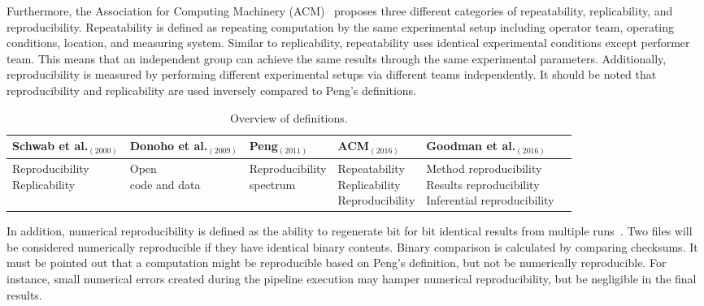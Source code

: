 Furthermore, the Association for Computing Machinery 
(ACM)~\cite{acm2016terminology} proposes three different categories of 
repeatability, replicability, and reproducibility. Repeatability is 
defined as repeating computation by the same experimental setup 
including operator team, operating conditions, location, and measuring 
system. 
Similar to replicability, repeatability uses identical experimental 
conditions except performer team.
This means that an independent group can achieve the 
same results through the same experimental parameters. 
Additionally, reproducibility is measured by performing 
different experimental setups via different teams 
independently. It should be noted that reproducibility and 
replicability are used inversely compared to Peng's definitions. 

\setlength{\tabcolsep}{1pt}
\begin{table}[H]
\hspace*{-1cm}
\caption{Overview of definitions.}
\label{table:definitions}
\centering
\begin{threeparttable}
\begin{tabular}{@{}llllll@{}}
\toprule
Schwab et al.$_{(2000)}$ & Donoho et al.$_{(2009)}$ & Peng$_{(2011)}$ & 
ACM$_{(2016)}$ & Goodman et al.$_{(2016)}$ \\ \midrule
\makecell{Reproducibility \\ Replicability} &   \makecell{Open \\ code 
and data} &   \makecell{Reproducibility \\ spectrum}  &   
\makecell{Repeatability \\ Replicability \\ Reproducibility} & 
\makecell{Method reproducibility \\ Results reproducibility \\ Inferential reproducibility}    \\ \bottomrule
\end{tabular}
\end{threeparttable}
\end{table}

In addition, numerical reproducibility is defined as the ability to 
regenerate bit for bit identical results from multiple 
runs~\cite{hill2017numerical}. Two files will be considered numerically 
reproducible if they have identical binary contents. Binary 
comparison is calculated by comparing checksums. It must be pointed out 
that a computation might be reproducible based on Peng's definition, 
but not be numerically reproducible. For instance, small numerical 
errors created during the pipeline execution may hamper numerical 
reproducibility, but be negligible in the final results.

